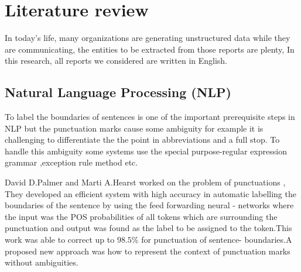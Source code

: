 \chapter{Literature review}

In today's life, many organizations are generating unstructured data while they are communicating, the entities to be extracted from those reports are plenty,
In this research, all reports we considered are written in English.
\section{Natural Language Processing (NLP)}

To label the boundaries of sentences is one of the important prerequisite steps in NLP but the punctuation marks cause some ambiguity \citep{palmer1994adaptive} for example it is challenging to differentiate the the point in abbreviations and a full stop. 
To handle this ambiguity some systems use the special purpose-regular expression grammar ,exception rule method etc.

David D.Palmer and Marti A.Hearst worked on the problem of punctuations \citep{palmer1994adaptive}, They developed an efficient system with high accuracy in automatic labelling the boundaries of the sentence  by using the feed forwarding neural - networks where the input was the POS probabilities of all tokens which are surrounding the punctuation  and output was found as the label to be assigned to the token.This work was able to correct up to $98.5\%$ for punctuation of  sentence- boundaries.A proposed  new approach was how to  represent the context of punctuation marks without ambiguities.

